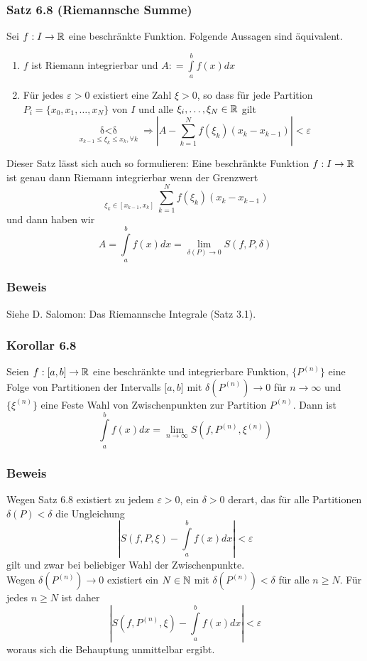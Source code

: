 \subsubsection*{Satz 6.8 (Riemannsche Summe)}
Sei $f:I\to \mathbb{R}$ eine beschränkte Funktion. Folgende Aussagen sind äquivalent.
\begin{enumerate}[\indent I)]
\item $f$ ist Riemann integrierbar und $A: = \int\limits_a^b {f(x)dx} $
\item Für jedes $\varepsilon>0$ existiert eine Zahl $\xi>0$, so dass für jede Partition $P_i=\{x_0,x_1,\dots,x_N\}$ von $I$ und alle $\xi_i,\dots,\xi_N \in \mathbb{R}$ gilt \[\mathop {\delta (P) < \delta }\limits_{{x_{k - 1}} \le {\xi _k} \le {x_k},\forall k}  \Rightarrow \left| {A - \sum\limits_{k = 1}^N {f({\xi _k})({x_k} - {x_{k - 1}})} } \right| < \varepsilon \]
\end{enumerate}
Dieser Satz lässt sich auch so formulieren: Eine beschränkte Funktion $f:I\to\mathbb{R}$ ist genau dann Riemann integrierbar wenn der Grenzwert \[\mathop {\mathop {\lim }\limits_{\delta (P) \to 0} }\limits_{{\xi _k} \in [{x_{k - 1}},{x_k}]} \sum\limits_{k = 1}^N {f({\xi _k})({x_k} - {x_{k - 1}})} \] und dann haben wir \[A=\int\limits_a^b {f(x)dx = \mathop {\lim }\limits_{\delta (P) \to 0} } S(f,P,\delta )\]

\subsubsection*{Beweis} Siehe D. Salomon: Das Riemannsche Integrale (Satz 3.1).
\subsubsection*{Korollar 6.8}
Seien $f:\lbrack a,b\rbrack\to\mathbb{R}$ eine beschränkte und integrierbare Funktion, $\{ P^{(n)}\}$ eine Folge von Partitionen der Intervalls $\lbrack a,b\rbrack$ mit $\delta(P^{(n)})\to 0$ für $n\to\infty$ und $\{\xi^{(n)}\}$ eine Feste Wahl von Zwischenpunkten zur Partition $P^{(n)}$. Dann ist
\[\int\limits_a^b {f(x)dx = \mathop {\lim }\limits_{n \to \infty } S(f,{P^{(n)}},{\xi ^{(n)}})} \]
\subsubsection*{Beweis}
Wegen Satz 6.8 existiert zu jedem $\varepsilon>0$, ein $\delta>0$ derart, das für alle Partitionen $\delta(P)<\delta$ die Ungleichung
\[\left| {S(f,P,\xi ) - \int\limits_a^b {f(x)dx} } \right| < \varepsilon \]
gilt und zwar bei beliebiger Wahl der Zwischenpunkte.\\
Wegen  $\delta(P^{(n)})\to 0$ existiert ein $N\in\mathbb{N}$ mit $\delta(P^{(n)})<\delta$ für alle $n\geq N$.
Für jedes $n\geq N$ ist daher \[\left| {S(f,{P^{(n)}},\xi ) - \int\limits_a^b {f(x)dx} } \right| < \varepsilon \] woraus sich die Behauptung unmittelbar ergibt.
